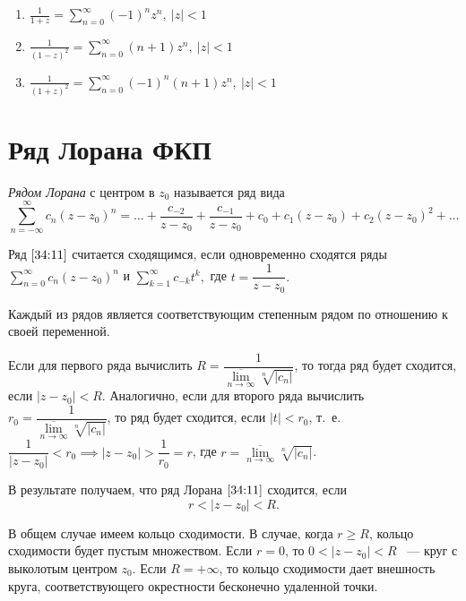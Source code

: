 \documentclass[../../main.tex]{subfiles}
\begin{document}
\begin{rems}
\begin{enumerate}
\begin{enumerate}
			\item $\displaystyle \frac{1}{1 + z} = \sum\limits_{n = 0}^{\infty} 
			(-1)^nz^n,\  |z| < 1$
			
			\item $\displaystyle \frac{1}{(1 - z)^2} = \sum\limits_{n = 0}^{\infty} (n 
			+ 1)z^n,\ |z| < 1$
			
			\item $\displaystyle \frac{1}{(1 + z)^2} = \sum\limits_{n = 0}^{\infty} 
			(-1)^n(n + 1)z^n,\ |z| < 1$
		\end{enumerate}
	\end{enumerate}
\end{rems}

\section{Ряд Лорана ФКП}

\emph{Рядом Лорана} с центром в $ z_0 $ называется ряд вида
\begin{equation}\label{34:11}
	\sum\limits_{n = -\infty}^{\infty}c_n(z - z_0)^n = \ldots + \frac{c_{-2}}{z - 
	z_0} + \frac{c_{-1}}{z - z_0} + c_0 + c_1(z - z_0) + c_2(z - z_0)^2 + \ldots
\end{equation}

Ряд $ \eqref{34:11} $ считается сходящимся, если одновременно сходятся ряды 
$ \sum\limits_{n = 0}^{\infty} c_n(z - z_0)^n$ и $ 
\sum\limits_{k = 1}^{\infty} c_{-k}t^k,$ где $t = \dfrac{1}{z - z_0}.$

Каждый из рядов является соответствующим степенным рядом по отношению к своей 
переменной.

Если для первого ряда вычислить $ R = \dfrac{1}{\overline{\underset{n \to 
\infty}{\lim}} \sqrt[n]{|c_n|}} $, то тогда ряд будет сходится, если $ |z - 
z_0| < R $.
Аналогично, если для второго ряда вычислить $ r_0 = 
\dfrac{1}{\overline{\underset{n \to \infty}{\lim}} \sqrt[n]{|c_n|}} $, то ряд 
будет сходится, если $ |t| < r_0 $, т.~е. $ \dfrac{1}{|z - z_0|} < r_0 
\implies 
|z - z_0| > \dfrac{1}{r_0} = r $, где $ r = \overline{\underset{n \to 
\infty}{\lim}} \sqrt[n]{|c_n|} $.

В результате получаем, что ряд Лорана $ \eqref{34:11} $ сходится, если
\[ r < |z - z_0| < R. \]

В общем случае имеем кольцо сходимости.
В случае, когда $ r \geq R $, кольцо сходимости будет пустым множеством.
Если $r = 0$, то $ 0 < |z - z_0| < R $ ~--- круг с выколотым центром $z_0$.
Если $ R = +\infty $, то кольцо сходимости дает внешность круга, 
соответствующего окрестности бесконечно удаленной точки.
\end{document}
